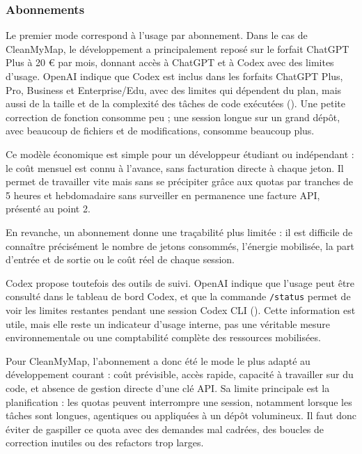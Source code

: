 \documentclass[
  10pt,
  a4paper,
  DIV=11,
  numbers=noendperiod,
  oneside]{scrreprt}
\begin{document}
\subsubsection{Abonnements}\label{abonnements}

Le premier mode correspond à l'usage par abonnement. Dans le cas de
CleanMyMap, le développement a principalement reposé sur le forfait
ChatGPT Plus à 20 € par mois, donnant accès à ChatGPT et à Codex avec
des limites d'usage. OpenAI indique que Codex est inclus dans les
forfaits ChatGPT Plus, Pro, Business et Enterprise/Edu, avec des limites
qui dépendent du plan, mais aussi de la taille et de la complexité des
tâches de code exécutées (). Une petite correction de fonction consomme peu ; une session
longue sur un grand dépôt, avec beaucoup de fichiers et de
modifications, consomme beaucoup plus.

Ce modèle économique est simple pour un développeur étudiant ou
indépendant : le coût mensuel est connu à l'avance, sans facturation
directe à chaque jeton. Il permet de travailler vite mais sans se
précipiter grâce aux quotas par tranches de 5 heures et hebdomadaire
sans surveiller en permanence une facture API, présenté au point 2.

En revanche, un abonnement donne une traçabilité plus limitée : il est
difficile de connaître précisément le nombre de jetons consommés,
l'énergie mobilisée, la part d'entrée et de sortie ou le coût réel de
chaque session.

Codex propose toutefois des outils de suivi. OpenAI indique que l'usage
peut être consulté dans le tableau de bord Codex, et que la commande
\texttt{/status} permet de voir les limites restantes pendant une
session Codex CLI ().
Cette information est utile, mais elle reste un indicateur d'usage
interne, pas une véritable mesure environnementale ou une comptabilité
complète des ressources mobilisées.

Pour CleanMyMap, l'abonnement a donc été le mode le plus adapté au
développement courant : coût prévisible, accès rapide, capacité à
travailler sur du code, et absence de gestion directe d'une clé API. Sa
limite principale est la planification : les quotas peuvent interrompre
une session, notamment lorsque les tâches sont longues, agentiques ou
appliquées à un dépôt volumineux. Il faut donc éviter de gaspiller ce
quota avec des demandes mal cadrées, des boucles de correction inutiles
ou des refactors trop larges.
\end{document}
